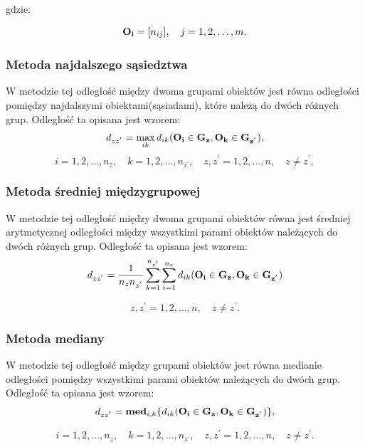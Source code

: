 \documentclass[12pt,a4paper]{report}
\begin{document}
gdzie:

$$
\bold{O_{i}}=[n_{ij}], \quad j=1,2,\dots,m.
$$

\subsubsection{Metoda najdalszego sąsiedztwa}


W metodzie tej odległość między dwoma grupami obiektów jest równa odległości pomiędzy najdalszymi obiektami(sąsiadami), które należą do dwóch różnych grup. Odległość ta opisana jest wzorem: 
$$
d_{zz^{'}}= \max\limits_{ik} {d_{ik}(\bf{O_i} \in G_{z}, O_{k} \in G_{z^{'}})},
$$
$$
i=1,2,\dots,n_{z}, \quad k=1,2,\dots,n_{z^{'}}, \quad z,z^{'}=1,2,\dots,n, \quad z \neq z^{'}, 
$$


\subsubsection{Metoda średniej międzygrupowej}


W metodzie tej odległość między dwoma grupami obiektów równa jest średniej arytmetycznej odległości między wszystkimi parami obiektów należących do dwóch różnych grup. Odległość ta opisana jest wzorem: 
$$
d_{zz^{'}}=\frac{1}{n_{z}n_{z^{'}}}\sum_{k=1}^{n_{z^{'}}}\sum_{i=1}^{n_{z}} d_{ik}(\bf{O_i} \in G_{z}, O_{k} \in G_{z^{'}})
$$

$$z,z^{'}=1,2,\dots,n, \quad z \neq z^{'}. $$


\subsubsection{Metoda mediany}


W metodzie tej odległość między grupami obiektów jest równa medianie odległości pomiędzy wszystkimi parami obiektów należących do dwóch grup. Odległość ta opisana jest wzorem: 
$$
d_{zz^{'}}= \bold{med}_{i,k} \{d_{ik}(\bf{O_i} \in G_{z}, O_{k} \in G_{z^{'}})\},
$$

$$i=1,2,\dots,n_{z}, \quad k=1,2,\dots,n_{z^{'}}, \quad z,z^{'}=1,2,\dots,n, \quad z \neq z^{'}. $$
\end{document}
